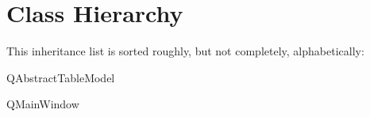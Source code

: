 \section{Class Hierarchy}
This inheritance list is sorted roughly, but not completely, alphabetically\+:\begin{DoxyCompactList}
\item Q\+Abstract\+Table\+Model\begin{DoxyCompactList}
\item {}
\end{DoxyCompactList}
\item Q\+Main\+Window\begin{DoxyCompactList}
\item {}
\end{DoxyCompactList}
\end{DoxyCompactList}
